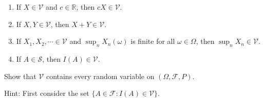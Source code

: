\documentclass[
  letterpaper,
  DIV=11,
  numbers=noendperiod]{scrreprt}
\theoremstyle{plain}
\theoremstyle{definition}
\theoremstyle{remark}
\begin{document}
\begin{enumerate}
\def\labelenumi{(\roman{enumi})}
\item
  If \(X \in \mathcal{V}\) and \(c \in \mathbb{R}\), then
  \(c X \in \mathcal{V}\).
\item
  If \(X, Y \in \mathcal{V}\), then \(X+Y \in \mathcal{V}\).
\item
  If \(X_{1}, X_{2}, \cdots \in \mathcal{V}\) and
  \(\sup _{n} X_{n}(\omega)\) is finite for all \(\omega \in \Omega\),
  then \(\sup _{n} X_{n} \in \mathcal{V}\).
\item
  If \(A \in \mathcal{S}\), then \(I(A) \in \mathcal{V}\).
\end{enumerate}

Show that \(\mathcal{V}\) contains every random variable on
\((\Omega, \mathcal{F}, P)\).

Hint: First consider the set
\(\{A \in \mathcal{F}: I(A) \in \mathcal{V}\}\).
\end{document}
